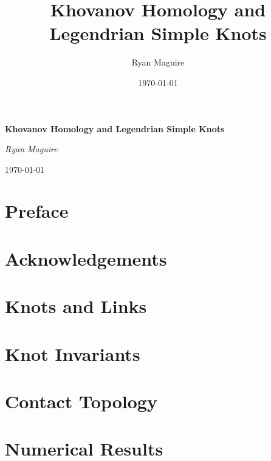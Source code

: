 \documentclass{book}
\title{Khovanov Homology and Legendrian Simple Knots}
\author{Ryan Maguire}
\date{\today}
\theoremstyle{plain}
\theoremstyle{normal}
\begin{document}
    \begin{titlepage}
        \centering
        \LARGE{\bfseries{Khovanov Homology and Legendrian Simple Knots}}
        \par\vspace{3.5cm}
        \par\vspace{4cm}
        \Large{\itshape{Ryan Maguire}}
        \par\vspace{1.5ex}
        \normalsize{\today}
    \end{titlepage}
    \nopagecolor
    \tableofcontents
    \listoffigures
    \listoftables
    \clearpage
    \chapter*{Preface}
    \clearpage
    \chapter*{Acknowledgements}
    \clearpage
    \chapter{Knots and Links}
        
        
        
        
    \chapter{Knot Invariants}
        
        
        
    \chapter{Contact Topology}
        
        
        
        
    \chapter{Numerical Results}
        
        
        
        
        
    \clearpage
    \nocite{*}
    
    
\end{document}
